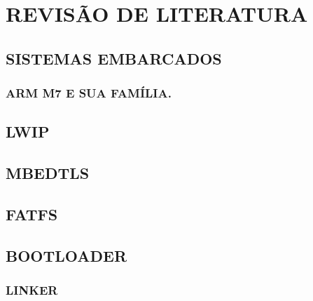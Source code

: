 
\chapter{REVISÃO DE LITERATURA}
\label{chap:fundamentacaoTeorica}

\section{SISTEMAS EMBARCADOS}
\subsection{ARM M7 E SUA FAMÍLIA.}
\section{LWIP}
\section{MBEDTLS}
\section{FATFS}
\section{BOOTLOADER}

\subsection{LINKER}


